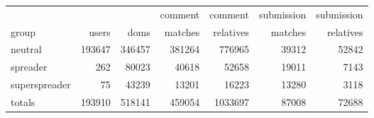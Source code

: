 \begin{tabular}{lrrrrrr}
\hline
& & & comment & comment & submission & submission \\
group & users & doms & matches & relatives & matches & relatives \\
\hline
neutral &  193647 &  346457 &           381264 &             776965 &               39312 &                 52842 \\
spreader &     262 &   80023 &            40618 &              52658 &               19011 &                  7143 \\
superspreader &      75 &   43239 &            13201 &              16223 &               13280 &                  3118 \\
totals &  193910 &  518141 &           459054 &            1033697 &               87008 &                 72688 \\
\hline
\end{tabular}
